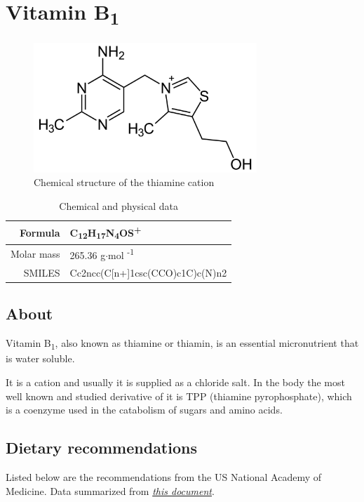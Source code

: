 \documentclass{book}
\begin{document}
\chapter{Vitamin B\textsubscript{1}}
\begin{figure}[h]
	\caption{Chemical structure of  the thiamine cation}
	\centering \includegraphics[width=0.75\textwidth]{images/Vitamin_B1_chemical_structure}
\end{figure}

\begin{table}[h]
	\caption{Chemical and physical data}
	\centering \begin{tabular}{| r | l |}
		\hline
		Formula & C\textsubscript{12}H\textsubscript{17}N\textsubscript{4}OS\textsuperscript{+}\\ \hline
		Molar mass & 265.36 g$\cdot$mol \textsuperscript{-1}\\ \hline
		SMILES & Cc2ncc(C[n+]1csc(CCO)c1C)c(N)n2\\ \hline
	\end{tabular}
\end{table}
\newpage

\section{About}
Vitamin B\textsubscript{1}, also known as thiamine or thiamin, is an essential micronutrient that is water soluble.

It is a cation and usually it is supplied as a chloride salt. In the body the most well known and studied derivative of it is TPP (thiamine pyrophosphate), which is a coenzyme used in the catabolism of sugars and amino acids.

\section{Dietary recommendations}
Listed below are the recommendations from the US National Academy of Medicine. Data summarized from \href{https://nap.nationalacademies.org/read/6015/chapter/6}{\textit{this document}}.
\end{document}
